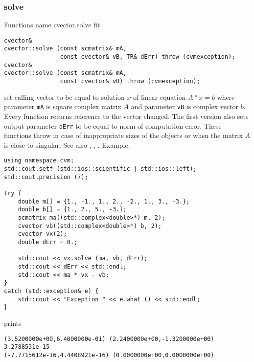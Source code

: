 \subsubsection{solve}
Functions%
\pdfdest name {cvector.solve} fit
\begin{verbatim}
cvector&
cvector::solve (const scmatrix& mA,
                const cvector& vB, TR& dErr) throw (cvmexception);
cvector&
cvector::solve (const scmatrix& mA,
                const cvector& vB) throw (cvmexception);
\end{verbatim}
set  calling vector to be equal to  solution $x$ of linear equation
$A*x=b$ where parameter \verb"mA" is  square complex matrix $A$
and parameter \verb"vB" is  complex vector $b$.
Every function returns  reference to the vector changed.
The first version also sets output parameter \verb"dErr" to be equal
to  norm of computation error.
These functions throw 
in case of inappropriate sizes
of the objects or when the matrix $A$ is close to singular.
See also  , 
, .
Example:
\begin{Verbatim}
using namespace cvm;
std::cout.setf (std::ios::scientific | std::ios::left);
std::cout.precision (7);

try {
    double m[] = {1., -1., 1., 2., -2., 1., 3., -3.};
    double b[] = {1., 2., 5., -3.};
    scmatrix ma((std::complex<double>*) m, 2);
    cvector vb((std::complex<double>*) b, 2);
    cvector vx(2);
    double dErr = 0.;

    std::cout << vx.solve (ma, vb, dErr);
    std::cout << dErr << std::endl;
    std::cout << ma * vx - vb;
}
catch (std::exception& e) {
    std::cout << "Exception " << e.what () << std::endl;
}
\end{Verbatim}
prints
\begin{Verbatim}
(3.5200000e+00,6.4000000e-01) (2.2400000e+00,-1.3200000e+00)
3.2788531e-15
(-7.7715612e-16,4.4408921e-16) (0.0000000e+00,0.0000000e+00)
\end{Verbatim}
\newpage




